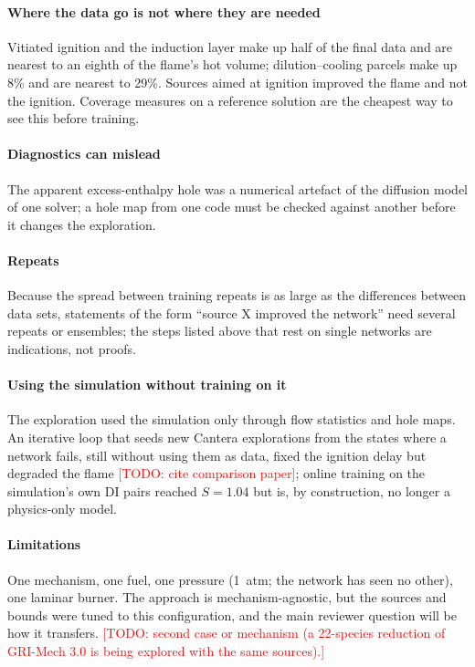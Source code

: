 \documentclass[preprint,review,12pt]{elsarticle}
\newcommand{\todo}[1]{\textcolor{red}{[TODO: #1]}}
\begin{document}
\paragraph{Where the data go is not where they are needed} Vitiated ignition and the induction layer make up half of
the final data and are nearest to an eighth of the flame's hot volume; dilution--cooling parcels make up 8\% and are
nearest to 29\%. Sources aimed at ignition improved the flame and not the ignition. Coverage measures on a reference
solution are the cheapest way to see this before training.

\paragraph{Diagnostics can mislead} The apparent excess-enthalpy hole was a numerical artefact of the diffusion model
of one solver; a hole map from one code must be checked against another before it changes the exploration.

\paragraph{Repeats} Because the spread between training repeats is as large as the differences between data sets,
statements of the form ``source X improved the network'' need several repeats or ensembles; the steps listed above that
rest on single networks are indications, not proofs.

\paragraph{Using the simulation without training on it} The exploration used the simulation only through flow
statistics and hole maps. An iterative loop that seeds new Cantera explorations from the states where a network fails,
still without using them as data, fixed the ignition delay but degraded the flame \todo{cite comparison paper}; online
training on the simulation's own DI pairs reached $S=1.04$ but is, by construction, no longer a physics-only model.

\paragraph{Limitations} One mechanism, one fuel, one pressure (1~atm; the network has seen no other), one laminar burner.
The approach is mechanism-agnostic, but the sources and bounds were tuned to this configuration, and the main reviewer
question will be how it transfers. \todo{second case or mechanism (a 22-species reduction of GRI-Mech 3.0 is being
explored with the same sources).}
\end{document}
